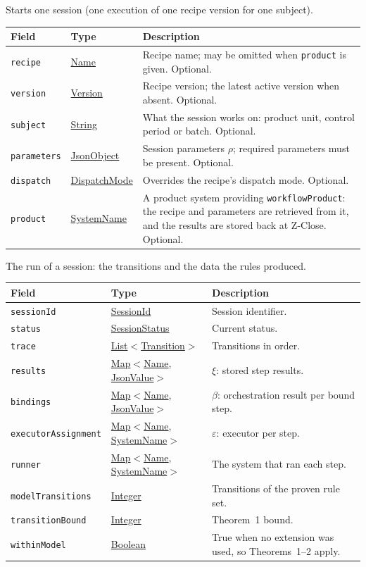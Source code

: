 \documentclass[a4paper]{arrowhead}
\newcommand{\mref}[1]{{\textcolor{ArrowheadPurple}{\hyperref[sec:model:#1]{#1}}}}
\newcommand{\pref}[1]{{\textcolor{ArrowheadGrey}{\hyperref[sec:model:primitives:#1]{#1}}}}
\begin{document}
Starts one session (one execution of one recipe version for one subject).

{\small
\begin{longtable}{|p{3.9cm}|p{4.4cm}|p{7.5cm}|}

\hline
\rowcolor{gray!33} Field & Type & Description \\ \hline
\endhead
\texttt{recipe} & \pref{Name} & Recipe name; may be omitted when \texttt{product} is given. Optional. \\ \hline
\texttt{version} & \pref{Version} & Recipe version; the latest active version when absent. Optional. \\ \hline
\texttt{subject} & \pref{String} & What the session works on: product unit, control period or batch. Optional. \\ \hline
\texttt{parameters} & \pref{JsonObject} & Session parameters $\rho$; required parameters must be present. Optional. \\ \hline
\texttt{dispatch} & \mref{DispatchMode} & Overrides the recipe's dispatch mode. Optional. \\ \hline
\texttt{product} & \pref{SystemName} & A product system providing \texttt{workflowProduct}: the recipe and parameters are retrieved from it, and the results are stored back at Z-Close. Optional. \\ \hline
\end{longtable}
}

The run of a session: the transitions and the data the rules produced.

{\small
\begin{longtable}{|p{3.9cm}|p{4.4cm}|p{7.5cm}|}

\hline
\rowcolor{gray!33} Field & Type & Description \\ \hline
\endhead
\texttt{sessionId} & \pref{SessionId} & Session identifier. \\ \hline
\texttt{status} & \mref{SessionStatus} & Current status. \\ \hline
\texttt{trace} & \pref{List}$<$\mref{Transition}$>$ & Transitions in order. \\ \hline
\texttt{results} & \pref{Map}$<$\pref{Name}, \pref{JsonValue}$>$ & $\xi$: stored step results. \\ \hline
\texttt{bindings} & \pref{Map}$<$\pref{Name}, \pref{JsonValue}$>$ & $\beta$: orchestration result per bound step. \\ \hline
\texttt{executorAssignment} & \pref{Map}$<$\pref{Name}, \pref{SystemName}$>$ & $\varepsilon$: executor per step. \\ \hline
\texttt{runner} & \pref{Map}$<$\pref{Name}, \pref{SystemName}$>$ & The system that ran each step. \\ \hline
\texttt{modelTransitions} & \pref{Integer} & Transitions of the proven rule set. \\ \hline
\texttt{transitionBound} & \pref{Integer} & Theorem~1 bound. \\ \hline
\texttt{withinModel} & \pref{Boolean} & True when no extension was used, so Theorems~1--2 apply. \\ \hline
\end{longtable}
}
\end{document}
